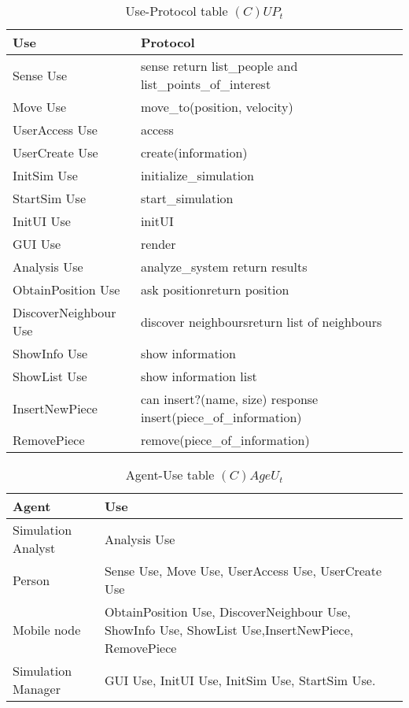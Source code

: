 \begin{table}[H]
	\centering
	\begin{tabular}{|p{4cm}|p{8cm}|}
			\hline
			\textbf{Use} & \textbf{Protocol} \\
			\hline
			Sense Use & sense \newline return list\_people and list\_points\_of\_interest \\
			\hline
			Move Use & move\_to(position, velocity) \\
			\hline
			UserAccess Use & access \\
			\hline
			UserCreate Use & create(information) \\
			\hline
			InitSim Use & initialize\_simulation \\
			\hline
			StartSim Use & start\_simulation \\
			\hline
			InitUI Use & initUI \\
			\hline
			GUI Use & render \\
			\hline
			Analysis Use & analyze\_system \newline return results\\
			\hline
			ObtainPosition Use & ask position\newline return position\\
			\hline
			DiscoverNeighbour Use & discover neighbours\newline return list of neighbours\\
			\hline
			ShowInfo Use & show information\\
			\hline
			ShowList Use & show information list\\
			\hline
			InsertNewPiece& can insert?(name, size) \newline response \newline
			insert(piece\_of\_information) \\
			\hline
			RemovePiece& remove(piece\_of\_information) \\
			\hline
		\end{tabular}
	\caption{Use-Protocol table $(C)UP_t$}
	\label{tab:cupt}
\end{table}

\begin{table}[H]
	\centering
	\begin{tabular}{|p{4cm}|p{8cm}|}
			\hline
			\textbf{Agent} & \textbf{Use} \\
			\hline
			Simulation Analyst & Analysis Use \\
			\hline
			Person & Sense Use, Move Use, UserAccess Use, UserCreate Use\\
			\hline
			Mobile node & ObtainPosition Use, DiscoverNeighbour Use, ShowInfo Use,
			ShowList Use,InsertNewPiece, RemovePiece  \\
			\hline
			Simulation Manager & GUI Use, InitUI Use, InitSim Use, StartSim Use. \\
			\hline
		\end{tabular}
	\caption{Agent-Use table $(C)AgeU_t$}
	\label{tab:cageut}
\end{table}

